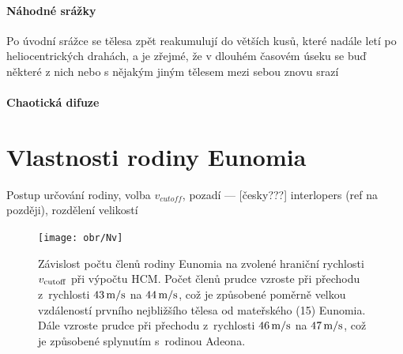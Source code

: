 \documentclass[A4paper, 12pt, oneside]{book}
\begin{document}
\subsubsection{Náhodné srážky}

Po úvodní srážce se tělesa zpět reakumulují do větších kusů, které nadále letí po heliocentrických drahách, a je zřejmé, že v dlouhém časovém úseku se buď některé z nich nebo s nějakým jiným tělesem mezi sebou znovu srazí

\subsubsection{Chaotická difuze}

\chapter{Vlastnosti rodiny Eunomia} \label{ch:eunomia}
Postup určování rodiny, volba $v_{cutoff}$, pozadí --- [česky???] interlopers (ref na později), rozdělení velikostí 
\begin{figure}[!htb]
	\centering
	\texttt{[image: obr/Nv]}
	\caption{Závislost počtu členů rodiny Eunomia na zvolené hraniční rychlosti $v_{\rm cutoff}$ při výpočtu HCM. Počet členů prudce vzroste při přechodu z~rychlosti $43\,{\rm m/s}$ na $44\,{\rm m/s}$, což je způsobené poměrně velkou vzdáleností prvního nejbližšího tělesa od mateřského (15) Eunomia. Dále vzroste prudce při přechodu z~rychlosti $46\,{\rm m/s}$ na $47\,{\rm m/s}$, což je způsobené splynutím s~rodinou Adeona.}
	\label{fig:Nv}
\end{figure}
\end{document}
